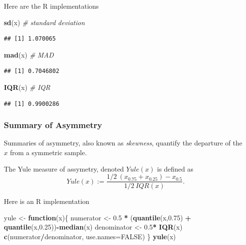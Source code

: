 \documentclass[]{book}
\newenvironment{Shaded}{\begin{snugshade}}{\end{snugshade}}
\newcommand{\KeywordTok}[1]{\textcolor[rgb]{0.13,0.29,0.53}{\textbf{#1}}}
\newcommand{\DataTypeTok}[1]{\textcolor[rgb]{0.13,0.29,0.53}{#1}}
\newcommand{\FloatTok}[1]{\textcolor[rgb]{0.00,0.00,0.81}{#1}}
\newcommand{\StringTok}[1]{\textcolor[rgb]{0.31,0.60,0.02}{#1}}
\newcommand{\CommentTok}[1]{\textcolor[rgb]{0.56,0.35,0.01}{\textit{#1}}}
\newcommand{\OtherTok}[1]{\textcolor[rgb]{0.56,0.35,0.01}{#1}}
\newcommand{\ControlFlowTok}[1]{\textcolor[rgb]{0.13,0.29,0.53}{\textbf{#1}}}
\newcommand{\OperatorTok}[1]{\textcolor[rgb]{0.81,0.36,0.00}{\textbf{#1}}}
\newcommand{\NormalTok}[1]{#1}
\theoremstyle{definition}
\theoremstyle{definition}
\theoremstyle{definition}
\theoremstyle{remark}
\let\BeginKnitrBlock\begin \let\EndKnitrBlock\end
\begin{document}
Here are the R implementations

\begin{Shaded}
\begin{Highlighting}[]
\KeywordTok{sd}\NormalTok{(x) }\CommentTok{# standard deviation}
\end{Highlighting}
\end{Shaded}

\begin{verbatim}
## [1] 1.070065
\end{verbatim}

\begin{Shaded}
\begin{Highlighting}[]
\KeywordTok{mad}\NormalTok{(x) }\CommentTok{# MAD}
\end{Highlighting}
\end{Shaded}

\begin{verbatim}
## [1] 0.7046802
\end{verbatim}

\begin{Shaded}
\begin{Highlighting}[]
\KeywordTok{IQR}\NormalTok{(x) }\CommentTok{# IQR}
\end{Highlighting}
\end{Shaded}

\begin{verbatim}
## [1] 0.9900286
\end{verbatim}

\subsubsection{Summary of Asymmetry}\label{summary-of-asymmetry}

Summaries of asymmetry, also known as \emph{skewness}, quantify the
departure of the \(x\) from a symmetric sample.

\BeginKnitrBlock{definition}[Yule]
\protect\hypertarget{def:unnamed-chunk-79}{}{\label{def:unnamed-chunk-79}
{} }The Yule measure of assymetry, denoted
\(Yule(x)\) is defined as
\[Yule(x) := \frac{1/2 \: (x_{0.75}+x_{0.25}) - x_{0.5} }{1/2 \: IQR(x)} .\]
\EndKnitrBlock{definition}

Here is an R implementation

\begin{Shaded}
\begin{Highlighting}[]
\NormalTok{yule <-}\StringTok{ }\ControlFlowTok{function}\NormalTok{(x)\{}
\NormalTok{  numerator <-}\StringTok{ }\FloatTok{0.5} \OperatorTok{*}\StringTok{ }\NormalTok{(}\KeywordTok{quantile}\NormalTok{(x,}\FloatTok{0.75}\NormalTok{) }\OperatorTok{+}\StringTok{ }\KeywordTok{quantile}\NormalTok{(x,}\FloatTok{0.25}\NormalTok{))}\OperatorTok{-}\KeywordTok{median}\NormalTok{(x) }
\NormalTok{  denominator <-}\StringTok{ }\FloatTok{0.5}\OperatorTok{*}\StringTok{ }\KeywordTok{IQR}\NormalTok{(x)}
  \KeywordTok{c}\NormalTok{(numerator}\OperatorTok{/}\NormalTok{denominator, }\DataTypeTok{use.names=}\OtherTok{FALSE}\NormalTok{)}
\NormalTok{\}}
\KeywordTok{yule}\NormalTok{(x)}
\end{Highlighting}
\end{Shaded}
\end{document}
